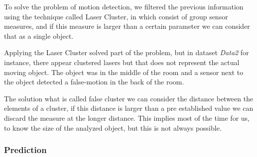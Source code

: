 \documentclass{article}
\begin{document}
To solve the problem of motion detection, we filtered the previous information using the technique called Laser Cluster, in which consist of group sensor measures, and if this measure is larger than a certain parameter we can consider that as a single object. 

Applying the Laser Cluster solved part of the problem, but in dataset \emph{Data2} for instance, there appear clustered lasers but that does not represent the actual moving object. The object was in the middle of the room and a sensor next to the object detected a false-motion in the back of the room.

The solution what is called false cluster we can consider the distance between the elements of a cluster, if this distance is larger than a pre established value we can discard the measure at the longer distance. This implies most of the time for us, to know the size of the analyzed object, but this is not always possible.

\subsubsection{Prediction}
\end{document}
